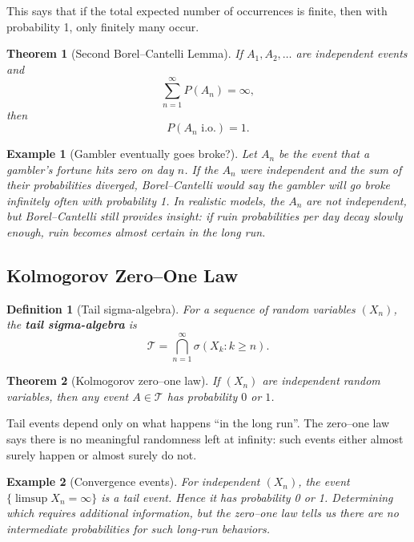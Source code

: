 \documentclass[11pt,a4paper]{article}
\newtheorem{definition}{Definition}[section]
\newtheorem{theorem}{Theorem}[section]
\newtheorem{example}{Example}[section]
\numberwithin{equation}{section}
\begin{document}
This says that if the total expected number of occurrences is finite, then with probability 1, only finitely many occur.

\begin{theorem}[Second Borel--Cantelli Lemma]
If $A_1,A_2,\dots$ are independent events and
\[
\sum_{n=1}^\infty P(A_n) = \infty,
\]
then
\[
P(A_n \text{ i.o.}) = 1.
\]
\end{theorem}

\begin{example}[Gambler eventually goes broke?]
Let $A_n$ be the event that a gambler's fortune hits zero on day $n$. 
If the $A_n$ were independent and the sum of their probabilities diverged, Borel--Cantelli would say the gambler will go broke infinitely often with probability 1. 
In realistic models, the $A_n$ are not independent, but Borel--Cantelli still provides insight: if ruin probabilities per day decay slowly enough, ruin becomes almost certain in the long run.

\end{example}

\subsection{Kolmogorov Zero--One Law}

\begin{definition}[Tail sigma-algebra]
For a sequence of random variables $(X_n)$, the \textbf{tail sigma-algebra} is
\[
\mathcal{T} = \bigcap_{n=1}^\infty \sigma(X_k : k\ge n).
\]
\end{definition}

\begin{theorem}[Kolmogorov zero--one law]
If $(X_n)$ are independent random variables, then any event $A \in \mathcal{T}$ has probability $0$ or $1$.
\end{theorem}

Tail events depend only on what happens ``in the long run''. 
The zero--one law says there is no meaningful randomness left at infinity: such events either almost surely happen or almost surely do not.

\begin{example}[Convergence events]
For independent $(X_n)$, the event $\{\limsup X_n = \infty\}$ is a tail event. 
Hence it has probability 0 or 1. 
Determining which requires additional information, but the zero--one law tells us there are no intermediate probabilities for such long-run behaviors.

\end{example}
\end{document}
